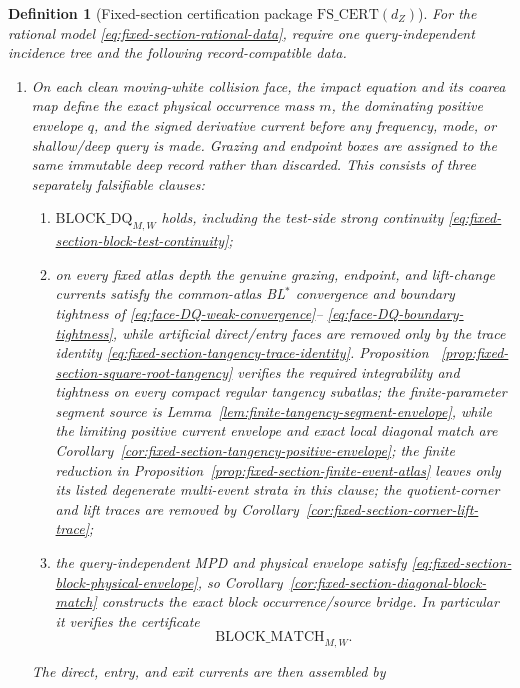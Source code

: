 \documentclass[11pt]{article}
\newtheorem{definition}[theorem]{Definition}
\begin{document}
\begin{definition}[Fixed-section certification package
$\mathrm{FS\_CERT}(d_Z)$]
\label{def:fixed-section-cert}
For the rational model \eqref{eq:fixed-section-rational-data}, require one
query-independent incidence tree and the following record-compatible data.
\begin{enumerate}[label=\textup{(FS\arabic*)}]
\item On each clean moving-white collision face, the impact equation and its
coarea map define the exact physical occurrence mass $m$, the dominating
positive envelope $q$, and the signed derivative current before any
frequency, mode, or shallow/deep query is made.  Grazing and endpoint boxes
are assigned to the same immutable deep record rather than discarded.
This consists of three separately falsifiable clauses:
\begin{enumerate}[label=\textup{(FS1\alph*)}]
\item $\mathrm{BLOCK\_DQ}_{M,W}$ holds, including the test-side strong
continuity \eqref{eq:fixed-section-block-test-continuity};
\item on every fixed atlas depth the genuine grazing, endpoint, and
lift-change currents satisfy the common-atlas BL$^*$ convergence and
boundary tightness of \eqref{eq:face-DQ-weak-convergence}--
\eqref{eq:face-DQ-boundary-tightness}, while artificial direct/entry faces
are removed only by the trace identity
\eqref{eq:fixed-section-tangency-trace-identity}.  Proposition~
\ref{prop:fixed-section-square-root-tangency} verifies the required
integrability and tightness on every compact regular tangency subatlas; the
finite-parameter segment source is
Lemma~\ref{lem:finite-tangency-segment-envelope}, while the limiting
positive current envelope and exact local diagonal match are
Corollary~\ref{cor:fixed-section-tangency-positive-envelope}; the
finite reduction in
Proposition~\ref{prop:fixed-section-finite-event-atlas} leaves only its
listed degenerate multi-event strata in this clause; the quotient-corner and
lift traces are removed by
Corollary~\ref{cor:fixed-section-corner-lift-trace};
\item the query-independent MPD and physical envelope satisfy
\eqref{eq:fixed-section-block-physical-envelope}, so
Corollary~\ref{cor:fixed-section-diagonal-block-match} constructs the exact
block occurrence/source bridge.  In particular it verifies the certificate
\[
 \mathrm{BLOCK\_MATCH}_{M,W}.
\]
\end{enumerate}
The direct, entry, and exit currents are then assembled by

\end{enumerate}
\end{definition}
\end{document}
